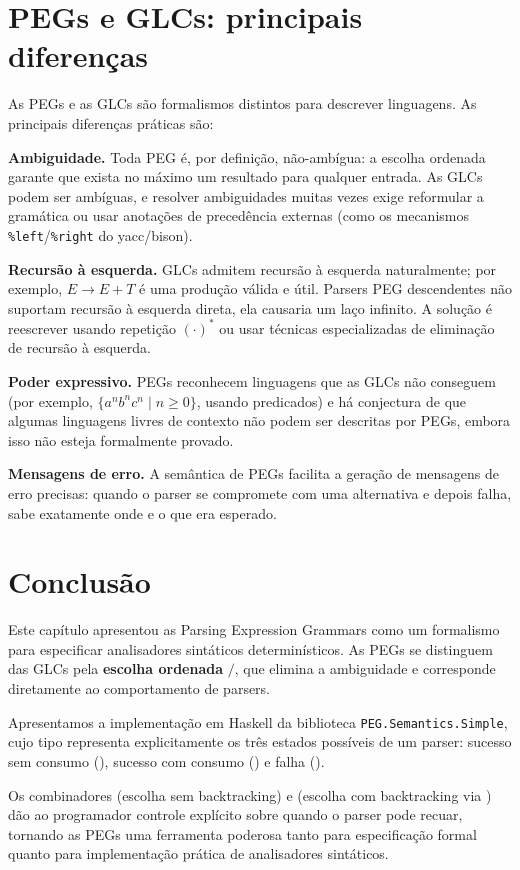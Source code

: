 \section{PEGs e GLCs: principais diferenças}

As PEGs e as GLCs são formalismos distintos para descrever
linguagens. As principais diferenças práticas são:

\textbf{Ambiguidade.} Toda PEG é, por definição, não-ambígua: a
escolha ordenada garante que exista no máximo um resultado para
qualquer entrada. As GLCs podem ser ambíguas, e resolver ambiguidades
muitas vezes exige reformular a gramática ou usar anotações de
precedência externas (como os mecanismos
  \verb|%left|/\verb|%right| do yacc/bison).

  \textbf{Recursão à esquerda.} GLCs admitem recursão à esquerda
  naturalmente; por exemplo, \(E \to E + T\) é uma produção válida e
  útil. Parsers PEG descendentes não suportam recursão à esquerda
  direta, ela causaria um laço infinito. A solução é reescrever
  usando repetição \((\cdot)^*\) ou usar técnicas especializadas de
  eliminação de recursão à esquerda.

  \textbf{Poder expressivo.} PEGs reconhecem linguagens que as GLCs não
  conseguem (por exemplo, \(\{a^n b^n c^n \mid n \geq 0\}\), usando
  predicados) e há conjectura de que algumas linguagens livres de
  contexto não podem ser descritas por PEGs, embora isso não esteja
  formalmente provado.

  \textbf{Mensagens de erro.} A semântica de PEGs facilita a geração de
  mensagens de erro precisas: quando o parser se compromete com uma
  alternativa e depois falha, sabe exatamente onde e o que era esperado.

  \section{Conclusão}

  Este capítulo apresentou as Parsing Expression Grammars como um
  formalismo para especificar analisadores sintáticos determinísticos.
  As PEGs se distinguem das GLCs pela \textbf{escolha ordenada} \(/\),
  que elimina a ambiguidade e corresponde diretamente ao
  comportamento de parsers.

  Apresentamos a implementação em Haskell da biblioteca
  \verb|PEG.Semantics.Simple|, cujo tipo
   representa explicitamente os
  três estados possíveis de um parser: sucesso sem consumo
  (), sucesso com consumo
  () e falha ().

  Os combinadores \haskell{<|>} (escolha sem
  backtracking) e \haskell{</>} (escolha com
  backtracking via ) dão ao programador
  controle explícito sobre quando o parser pode recuar, tornando as
  PEGs uma ferramenta poderosa tanto para especificação formal quanto
  para implementação prática de analisadores sintáticos.
